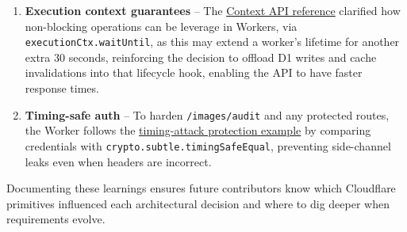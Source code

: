 \documentclass[12pt]{article}
\begin{document}
\begin{enumerate}[leftmargin=*]
  \item \textbf{Execution context guarantees} – The \href{https://developers.cloudflare.com/workers/runtime-apis/context/}{Context API reference} clarified how non-blocking operations can be leverage in Workers, via \texttt{executionCtx.waitUntil}, as this may extend a worker's lifetime for another extra 30 seconds, reinforcing the decision to offload D1 writes and cache invalidations into that lifecycle hook, enabling the API to have faster response times.
  \item \textbf{Timing-safe auth} – To harden \texttt{/images/audit} and any protected routes, the Worker follows the \href{https://developers.cloudflare.com/workers/examples/protect-against-timing-attacks/}{timing-attack protection example} by comparing credentials with \texttt{crypto.subtle.timingSafeEqual}, preventing side-channel leaks even when headers are incorrect.
\end{enumerate}

Documenting these learnings ensures future contributors know which Cloudflare primitives influenced each architectural decision and where to dig deeper when requirements evolve.
\end{document}

